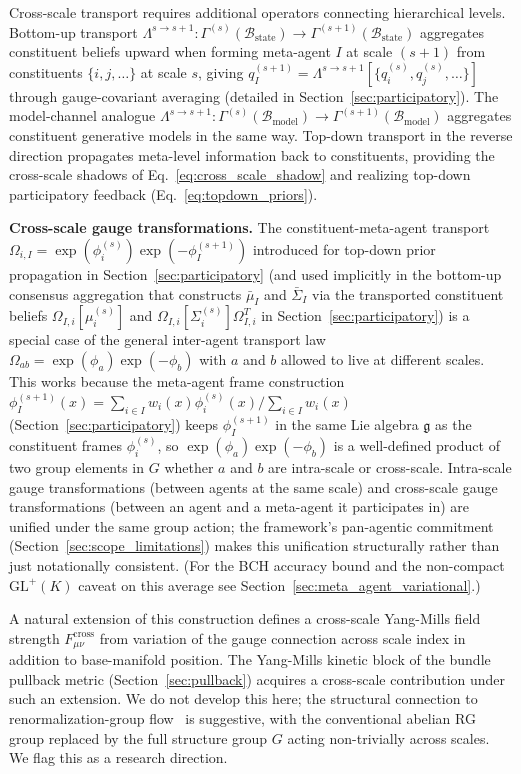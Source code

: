 \documentclass[11pt]{article}
\begin{document}
Cross-scale transport requires additional operators connecting hierarchical levels. Bottom-up transport $\Lambda^{s \to s+1}: \Gamma^{(s)}(\mathcal{B}_{\mathrm{state}}) \to \Gamma^{(s+1)}(\mathcal{B}_{\mathrm{state}})$ aggregates constituent beliefs upward when forming meta-agent $I$ at scale $(s+1)$ from constituents $\{i,j,\ldots\}$ at scale $s$, giving $q_I^{(s+1)} = \Lambda^{s \to s+1}[\{q_i^{(s)}, q_j^{(s)}, \ldots\}]$ through gauge-covariant averaging (detailed in Section~\ref{sec:participatory}). The model-channel analogue $\Lambda^{s \to s+1}: \Gamma^{(s)}(\mathcal{B}_{\mathrm{model}}) \to \Gamma^{(s+1)}(\mathcal{B}_{\mathrm{model}})$ aggregates constituent generative models in the same way. Top-down transport in the reverse direction propagates meta-level information back to constituents, providing the cross-scale shadows of Eq.~\eqref{eq:cross_scale_shadow} and realizing top-down participatory feedback (Eq.~\eqref{eq:topdown_priors}).

\textbf{Cross-scale gauge transformations.} The constituent-meta-agent transport $\Omega_{i,I} = \exp(\phi_i^{(s)})\exp(-\phi_I^{(s+1)})$ introduced for top-down prior propagation in Section~\ref{sec:participatory} (and used implicitly in the bottom-up consensus aggregation that constructs $\bar{\mu}_I$ and $\bar{\Sigma}_I$ via the transported constituent beliefs $\Omega_{I,i}[\mu_i^{(s)}]$ and $\Omega_{I,i}[\Sigma_i^{(s)}]\Omega_{I,i}^T$ in Section~\ref{sec:participatory}) is a special case of the general inter-agent transport law $\Omega_{ab} = \exp(\phi_a)\exp(-\phi_b)$ with $a$ and $b$ allowed to live at different scales. This works because the meta-agent frame construction $\phi_I^{(s+1)}(x) = \sum_{i \in I} w_i(x) \phi_i^{(s)}(x) / \sum_{i \in I} w_i(x)$ (Section~\ref{sec:participatory}) keeps $\phi_I^{(s+1)}$ in the same Lie algebra $\mathfrak{g}$ as the constituent frames $\phi_i^{(s)}$, so $\exp(\phi_a)\exp(-\phi_b)$ is a well-defined product of two group elements in $G$ whether $a$ and $b$ are intra-scale or cross-scale. Intra-scale gauge transformations (between agents at the same scale) and cross-scale gauge transformations (between an agent and a meta-agent it participates in) are unified under the same group action; the framework's pan-agentic commitment (Section~\ref{sec:scope_limitations}) makes this unification structurally rather than just notationally consistent. (For the BCH accuracy bound and the non-compact $\mathrm{GL}^+(K)$ caveat on this average see Section~\ref{sec:meta_agent_variational}.)

A natural extension of this construction defines a cross-scale Yang-Mills field strength $F^{\mathrm{cross}}_{\mu\nu}$ from variation of the gauge connection across scale index in addition to base-manifold position. The Yang-Mills kinetic block of the bundle pullback metric (Section~\ref{sec:pullback}) acquires a cross-scale contribution under such an extension. We do not develop this here; the structural connection to renormalization-group flow~\cite{Wilson1971, Cardy1996} is suggestive, with the conventional abelian RG group replaced by the full structure group $G$ acting non-trivially across scales. We flag this as a research direction.
\end{document}
